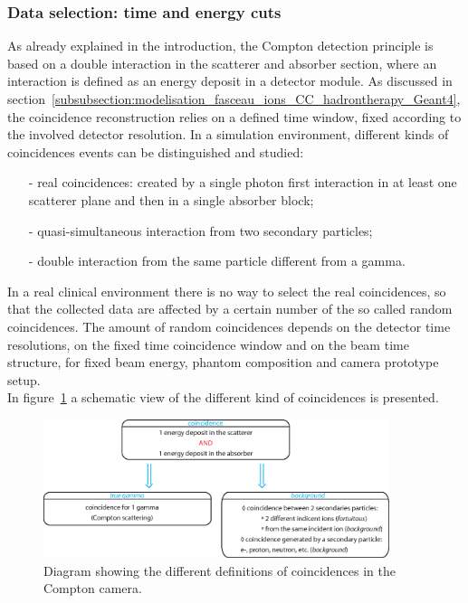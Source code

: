 \newpage
\subsubsection{Data selection: time and energy cuts}
\label{MatMeth::TOF_Ecut}

As already explained in the introduction, the Compton detection principle is based on a double interaction in the scatterer and absorber section, where an interaction is defined as an energy deposit in a detector module. As discussed in section~\ref{subsubsection:modelisation_fasceau_ions_CC_hadrontherapy_Geant4}, the coincidence reconstruction relies on a defined time window, fixed according to the involved detector resolution. In a simulation environment, different kinds of coincidences events can be distinguished and studied: 
\begin{itemize}
\item[-] real coincidences: created by a single photon first interaction in at least one scatterer plane and then in a single absorber block;
\item[-] quasi-simultaneous interaction from two secondary particles;
\item[-] double interaction from the same particle different from a gamma.
\end{itemize}
In a real clinical environment there is no way to select the real coincidences, so that the collected data are affected by a certain number of the so called random coincidences. The amount of random coincidences depends on the detector time resolutions, on the fixed time coincidence window and on the beam time structure, for fixed beam energy, phantom composition and camera prototype setup.\\

In figure~\ref{fig:fig_explication_coincidence_CC_simulation_Hadronth} a schematic view of the different kind of coincidences is presented.
	\begin{figure} [!hbtp]	
	\centering
	\includegraphics[width=0.9\textwidth]{./Figure/Schema_coincidence_EN.eps}
	\caption{Diagram showing the different definitions of coincidences in the Compton camera.}
	 \label{fig:fig_explication_coincidence_CC_simulation_Hadronth}
	\end{figure}


